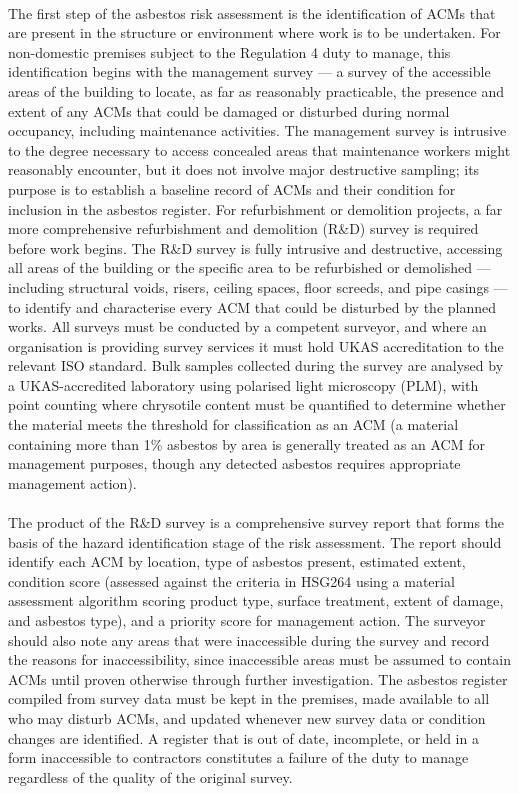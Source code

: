 \paragraph{}
The first step of the asbestos risk assessment is the identification of ACMs that are present in the structure or environment where work is to be undertaken. For non-domestic premises subject to the Regulation 4 duty to manage, this identification begins with the management survey — a survey of the accessible areas of the building to locate, as far as reasonably practicable, the presence and extent of any ACMs that could be damaged or disturbed during normal occupancy, including maintenance activities. The management survey is intrusive to the degree necessary to access concealed areas that maintenance workers might reasonably encounter, but it does not involve major destructive sampling; its purpose is to establish a baseline record of ACMs and their condition for inclusion in the asbestos register. For refurbishment or demolition projects, a far more comprehensive refurbishment and demolition (R\&D) survey is required before work begins. The R\&D survey is fully intrusive and destructive, accessing all areas of the building or the specific area to be refurbished or demolished — including structural voids, risers, ceiling spaces, floor screeds, and pipe casings — to identify and characterise every ACM that could be disturbed by the planned works. All surveys must be conducted by a competent surveyor, and where an organisation is providing survey services it must hold UKAS accreditation to the relevant ISO standard. Bulk samples collected during the survey are analysed by a UKAS-accredited laboratory using polarised light microscopy (PLM), with point counting where chrysotile content must be quantified to determine whether the material meets the threshold for classification as an ACM (a material containing more than 1\% asbestos by area is generally treated as an ACM for management purposes, though any detected asbestos requires appropriate management action).

\paragraph{}
The product of the R\&D survey is a comprehensive survey report that forms the basis of the hazard identification stage of the risk assessment. The report should identify each ACM by location, type of asbestos present, estimated extent, condition score (assessed against the criteria in HSG264 using a material assessment algorithm scoring product type, surface treatment, extent of damage, and asbestos type), and a priority score for management action. The surveyor should also note any areas that were inaccessible during the survey and record the reasons for inaccessibility, since inaccessible areas must be assumed to contain ACMs until proven otherwise through further investigation. The asbestos register compiled from survey data must be kept in the premises, made available to all who may disturb ACMs, and updated whenever new survey data or condition changes are identified. A register that is out of date, incomplete, or held in a form inaccessible to contractors constitutes a failure of the duty to manage regardless of the quality of the original survey.

